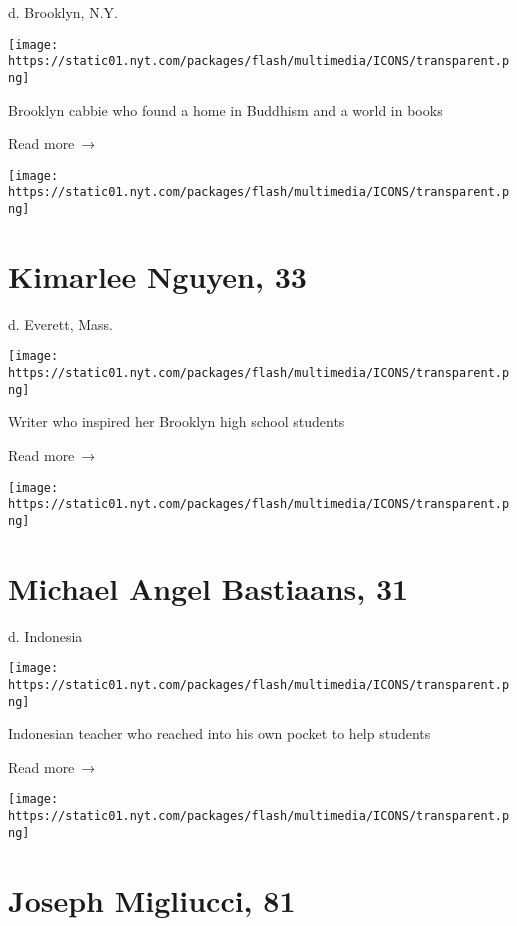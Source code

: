 d. Brooklyn, N.Y.

\texttt{[image: https://static01.nyt.com/packages/flash/multimedia/ICONS/transparent.png]}

Brooklyn cabbie who found a home in Buddhism and a world in books

 Read more~→

\href{https://www.nytimes.com/2020/04/15/obituaries/kimarlee-nguyen-dead-coronavirus.html}{}

\texttt{[image: https://static01.nyt.com/packages/flash/multimedia/ICONS/transparent.png]}

\hypertarget{kimarlee-nguyen-33}{%
\section{Kimarlee Nguyen, 33}\label{kimarlee-nguyen-33}}

d. Everett, Mass.

\texttt{[image: https://static01.nyt.com/packages/flash/multimedia/ICONS/transparent.png]}

Writer who inspired her Brooklyn high school students

 Read more~→

\href{https://www.nytimes.com/2020/04/15/obituaries/bastiaans-dead-coronavirus.html}{}

\texttt{[image: https://static01.nyt.com/packages/flash/multimedia/ICONS/transparent.png]}

\hypertarget{michael-angel-bastiaans-31}{%
\section{Michael Angel Bastiaans, 31}\label{michael-angel-bastiaans-31}}

d. Indonesia

\texttt{[image: https://static01.nyt.com/packages/flash/multimedia/ICONS/transparent.png]}

Indonesian teacher who reached into his own pocket to help students

 Read more~→

\href{https://www.nytimes.com/2020/04/14/obituaries/joseph-migliucci-dead-coronavirus.html}{}

\texttt{[image: https://static01.nyt.com/packages/flash/multimedia/ICONS/transparent.png]}

\hypertarget{joseph-migliucci-81}{%
\section{Joseph Migliucci, 81}\label{joseph-migliucci-81}}

